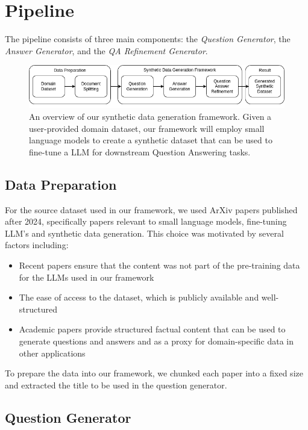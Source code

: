 \section{Pipeline}\label{sec:pipeline}

The pipeline consists of three main components: the \textit{Question Generator}, the \textit{Answer Generator}, and the \textit{QA Refinement Generator}.

\begin{figure}[h]
  \centering
  \includegraphics[width=\textwidth]{methodology-overview.png}
  \caption{An overview of our synthetic data generation framework. Given a user-provided domain dataset, our
framework will employ small language models to create a synthetic dataset that can be used
to fine-tune a LLM for downstream Question Answering tasks.}
\end{figure}

\subsection{Data Preparation}
For the source dataset used in our framework, we used ArXiv papers published after 2024, specifically papers relevant to
small language models, fine-tuning LLM's and synthetic data generation.
This choice was motivated by several factors including:
\begin{itemize}
  \item Recent papers ensure that the content was not part of the pre-training data for the LLMs used in our framework
  \item The ease of access to the dataset, which is publicly available and well-structured
  \item Academic papers provide structured factual content that can be used to generate questions and answers and as a proxy for
  domain-specific data in other applications
\end{itemize}

To prepare the data into our framework, we chunked each paper into a fixed size and extracted the title to be used in the
question generator. 

\subsection{Question Generator}\label{sec:question-generator}

